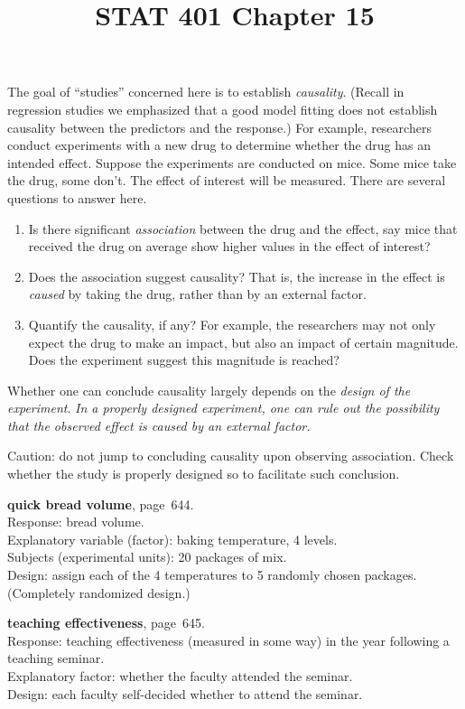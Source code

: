 \documentclass[12pt]{article}
\begin{document}
\title{STAT 401 Chapter 15}
\maketitle

The goal of ``studies'' concerned here is to establish
\emph{causality}.
(Recall in regression studies we emphasized that a good model fitting
does not establish causality between the predictors and the response.)
For example,
researchers conduct experiments with a new drug to determine whether the
drug has an intended effect.
Suppose the experiments are conducted on mice.
Some mice take the drug, some don't.
The effect of interest will be measured.
There are several questions to answer here.
\begin{enumerate}
\item Is there significant \emph{association} between the drug and the
effect, say mice that received the drug on average show higher values in
the effect of interest?
\item Does the association suggest causality? That is, the increase in the
effect is \emph{caused} by taking the drug, rather than by an external
factor.
\item Quantify the causality, if any? For example, the researchers
may not only expect the drug to make an impact, but also an impact of
certain magnitude. Does the experiment suggest this magnitude is
reached?
\end{enumerate}

Whether one can conclude causality largely depends on the
\emph{design of the experiment}.
\emph{In a properly designed experiment, one can rule out the possibility that
the observed effect is caused by an external factor.}

Caution: do not jump to concluding causality upon observing association.
Check whether the study is properly designed so to facilitate such
conclusion.

\example
\textbf{quick bread volume}, page~644.\\
Response: bread volume.\\
Explanatory variable (factor): baking temperature, 4 levels.\\
Subjects (experimental units): 20 packages of mix.\\
Design: assign each of the 4 temperatures to 5 randomly chosen packages.
(Completely randomized design.)

\example
\textbf{teaching effectiveness}, page~645.\\
Response: teaching effectiveness (measured in some way) in the year
following a teaching seminar.\\
Explanatory factor: whether the faculty attended the seminar.\\
Design: each faculty self-decided whether to attend the seminar.
\end{document}
